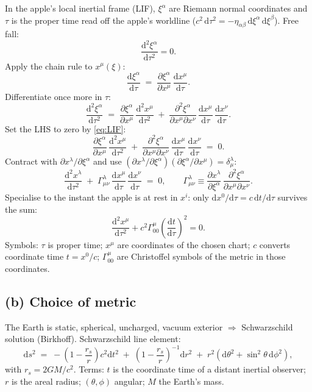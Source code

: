 \documentclass[11pt]{article}
\newcommand{\de}{\mathrm{d}}
\newcommand{\pd}[2]{\frac{\partial #1}{\partial #2}}
\begin{document}
In the apple's local inertial frame (LIF), $\xi^\alpha$ are Riemann normal coordinates and $\tau$ is the proper time read off the apple's worldline ($c^2\,\de\tau^2 = -\eta_{\alpha\beta}\,\de\xi^\alpha\,\de\xi^\beta$). Free fall:
\begin{equation}
\frac{\de^2 \xi^\alpha}{\de\tau^2}=0.
\label{eq:LIF}
\end{equation}
Apply the chain rule to $x^\mu(\xi)$:
\[
\frac{\de \xi^\alpha}{\de\tau} \;=\; \pd{\xi^\alpha}{x^\mu}\,\frac{\de x^\mu}{\de\tau}.
\]
Differentiate once more in $\tau$:
\[
\frac{\de^2 \xi^\alpha}{\de\tau^2} \;=\; \pd{\xi^\alpha}{x^\mu}\,\frac{\de^2 x^\mu}{\de\tau^2} \;+\; \frac{\partial^2\xi^\alpha}{\partial x^\mu\partial x^\nu}\,\frac{\de x^\mu}{\de\tau}\,\frac{\de x^\nu}{\de\tau}.
\]
Set the LHS to zero by \eqref{eq:LIF}:
\[
\pd{\xi^\alpha}{x^\mu}\,\frac{\de^2 x^\mu}{\de\tau^2} \;+\; \frac{\partial^2\xi^\alpha}{\partial x^\mu\partial x^\nu}\,\frac{\de x^\mu}{\de\tau}\,\frac{\de x^\nu}{\de\tau} \;=\;0.
\]
Contract with $\partial x^\lambda/\partial\xi^\alpha$ and use $(\partial x^\lambda/\partial\xi^\alpha)(\partial\xi^\alpha/\partial x^\mu)=\delta^\lambda_\mu$:
\[
\frac{\de^2 x^\lambda}{\de\tau^2} \;+\; \Gamma^{\lambda}_{\mu\nu}\,\frac{\de x^\mu}{\de\tau}\,\frac{\de x^\nu}{\de\tau} \;=\; 0,\qquad \Gamma^{\lambda}_{\mu\nu}\equiv\pd{x^\lambda}{\xi^\alpha}\,\frac{\partial^2\xi^\alpha}{\partial x^\mu\partial x^\nu}.
\]
Specialise to the instant the apple is at rest in $x^i$: only $\de x^0/\de\tau=c\,\de t/\de\tau$ survives the sum:
\begin{equation}
\boxed{\;\frac{\de^2 x^\mu}{\de\tau^2}+c^2\Gamma^{\mu}_{00}\!\left(\frac{\de t}{\de\tau}\right)^{2}=0.\;}
\label{eq:geodapple}
\end{equation}
Symbols: $\tau$ is proper time; $x^\mu$ are coordinates of the chosen chart; $c$ converts coordinate time $t=x^0/c$; $\Gamma^{\mu}_{00}$ are Christoffel symbols of the metric in those coordinates.

\subsection*{(b) Choice of metric}

The Earth is static, spherical, uncharged, vacuum exterior $\Rightarrow$ Schwarzschild solution (Birkhoff). Schwarzschild line element:
\begin{equation}
\de s^2 \;=\; -\!\left(1-\frac{r_s}{r}\right)c^2\de t^2 \;+\; \!\left(1-\frac{r_s}{r}\right)^{-1}\!\de r^2 \;+\; r^2(\de\theta^2+\sin^2\theta\,\de\phi^2),
\label{eq:schw}
\end{equation}
with $r_s=2GM/c^2$. Terms: $t$ is the coordinate time of a distant inertial observer; $r$ is the areal radius; $(\theta,\phi)$ angular; $M$ the Earth's mass.
\end{document}
